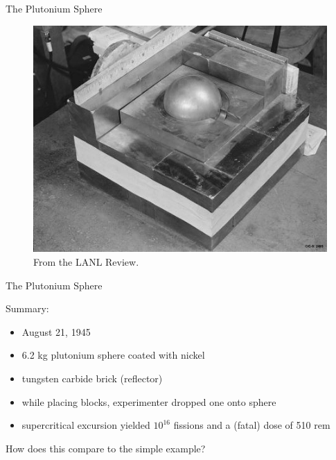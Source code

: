 \documentclass[10pt]{beamer}
\begin{document}
\begin{frame}[fragile]{The Plutonium Sphere}

  \begin{figure}
    \includegraphics[keepaspectratio, width = 3.2 in]{images/pu_sphere}
    \caption{From the LANL Review.}
  \end{figure}

\end{frame}

\begin{frame}{The Plutonium Sphere}

Summary:
\begin{itemize}
 \item August 21, 1945
 \item 6.2 kg plutonium sphere coated with nickel
 \item tungsten carbide brick (reflector)
 \item while placing blocks, experimenter dropped one onto sphere
 \item supercritical excursion yielded $10^{16}$ fissions and a (fatal)
       dose of 510 rem
\end{itemize}
\vfill
\textcolor{mitred}{How does this compare to the simple example?}

\end{frame}
\end{document}
